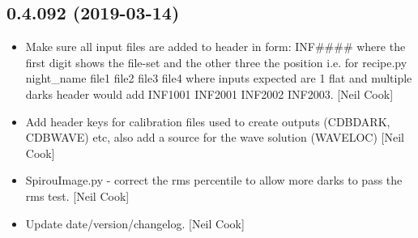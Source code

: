 \documentclass[a4paper,10pt,english]{report}
\begin{document}
\subsection{0.4.092 (2019-03-14)}
\label{\detokenize{misc/changelog:id166}}\begin{itemize}
\item {} 
Make sure all input files are added to header in form: INF\#\#\#\# where
the first digit shows the file-set and the other three the position
i.e. for recipe.py night\_name file1 file2 file3 file4   where inputs
expected are 1 flat and multiple darks header would add INF1001
INF2001 INF2002 INF2003. {[}Neil Cook{]}

\item {} 
Add header keys for calibration files used to create outputs (CDBDARK,
CDBWAVE) etc, also add a source for the wave solution (WAVELOC) {[}Neil
Cook{]}

\item {} 
SpirouImage.py - correct the rms percentile to allow more darks to
pass the rms test. {[}Neil Cook{]}

\item {} 
Update date/version/changelog. {[}Neil Cook{]}

\end{itemize}
\end{document}
